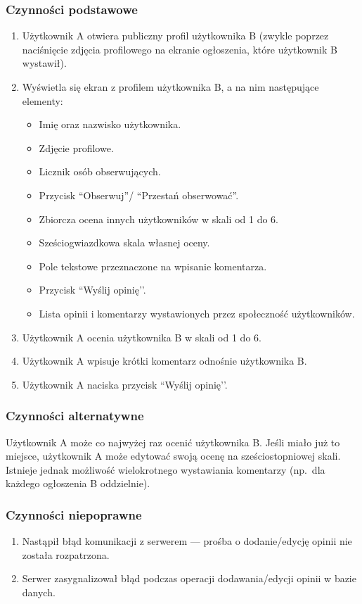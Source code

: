 \documentclass[licencjacka]{pracamgr}
\begin{document}
    \subsubsection{Czynności podstawowe}
    \begin{enumerate}
        \item Użytkownik A otwiera publiczny profil użytkownika B (zwykle poprzez naciśnięcie zdjęcia profilowego na ekranie ogłoszenia, które użytkownik B wystawił).
        \item Wyświetla się ekran z profilem użytkownika B, a na nim następujące elementy:
        \begin{itemize}
            \item Imię oraz nazwisko użytkownika.
            \item Zdjęcie profilowe.
            \item Licznik osób obserwujących.
            \item Przycisk ``Obserwuj''/ ``Przestań obserwować''.
            \item Zbiorcza ocena innych użytkowników w skali od 1 do 6.
            \item Sześciogwiazdkowa skala własnej oceny.
            \item Pole tekstowe przeznaczone na wpisanie komentarza.
            \item Przycisk ``Wyślij opinię’’.
            \item Lista opinii i komentarzy wystawionych przez społeczność użytkowników.
        \end{itemize}
        \item Użytkownik A ocenia użytkownika B w skali od 1 do 6.
        \item Użytkownik A wpisuje krótki komentarz odnośnie użytkownika B.
        \item Użytkownik A naciska przycisk ``Wyślij opinię’’.
    \end{enumerate}
    \subsubsection{Czynności alternatywne}
    Użytkownik A może co najwyżej raz ocenić użytkownika B. Jeśli miało już to miejsce, użytkownik A może edytować swoją ocenę na sześciostopniowej skali. Istnieje jednak możliwość wielokrotnego wystawiania komentarzy (np.\ dla każdego ogłoszenia B oddzielnie).
    \subsubsection{Czynności niepoprawne}
    \begin{enumerate}
        \item Nastąpił błąd komunikacji z serwerem --- prośba o dodanie/edycję opinii nie została rozpatrzona.
        \item Serwer zasygnalizował błąd podczas operacji dodawania/edycji opinii w bazie danych.
    \end{enumerate}
\end{document}
